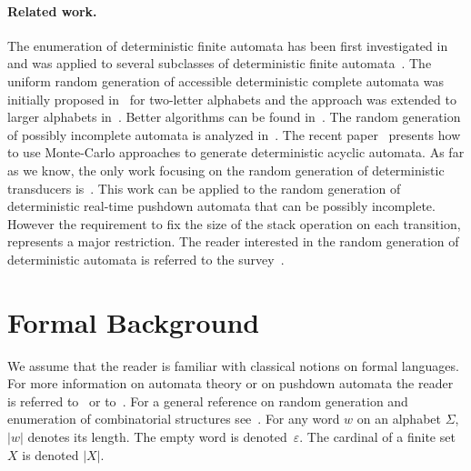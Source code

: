 \paragraph{Related work.}  The 
enumeration of deterministic finite automata has been first investigated
in~\cite{Vyssotsky} and was applied to several subclasses of deterministic
finite
automata~\cite{Korshunov,DBLP:journals/eik/Korshunov86,robinson,DBLP:journals/dam/Liskovets06}. 
The uniform random generation of accessible deterministic complete automata
was initially proposed in~\cite{thesecril} for two-letter alphabets and the
approach was extended to larger alphabets
in~\cite{DBLP:journals/tcs/ChamparnaudP05}. Better algorithms can be found
in~\cite{DBLP:journals/tcs/BassinoN07,DBLP:conf/stacs/CarayolN12}. The
random generation of possibly incomplete automata is analyzed
in~\cite{incomplet}. The recent paper~\cite{DBLP:conf/wia/CarninoF11}
presents how to use Monte-Carlo approaches to generate deterministic acyclic
automata. As far as we know, the only work focusing on the random generation
of deterministic transducers is~\cite{DBLP:journals/tcs/HeamNS10}. This work
can be applied to the random generation of deterministic real-time
pushdown automata that can be possibly incomplete. However the requirement to fix the size of the stack operation on each transition, represents a major restriction.
The reader interested in the random generation of deterministic automata is
 referred to the survey~\cite{DBLP:conf/mfcs/Nicaud14}. 






\section{Formal Background}\label{sec:bg}


We assume that the reader is familiar with classical notions on formal
languages. For more information on automata theory or on pushdown automata
the reader is referred to~\cite{Hopcroft} or to~\cite{Saka}. For a general
reference on random generation and enumeration of combinatorial structures
see~\cite{DBLP:journals/tcs/FlajoletZC94}. For any word $w$ on an alphabet $\Sigma$, $|w|$ denotes
its length. The empty word is denoted~$\varepsilon$.
The cardinal of a finite set $X$ is denoted $|X|$.

